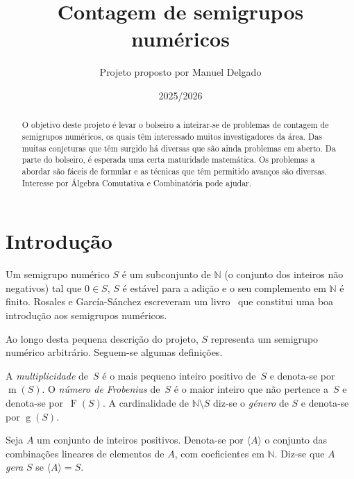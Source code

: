 \documentclass[12pt,a4paper]{article}
\title{Contagem de semigrupos numéricos}
\author{Projeto proposto por Manuel Delgado}
\date{2025/2026}
\numberwithin{table}{section}
\numberwithin{figure}{section}
\numberwithin{equation}{section}
\DeclareMathOperator{\Frobeniusoper}{F} %
\DeclareMathOperator{\multiplicityoper}{m} %
\DeclareMathOperator{\genusoper}{g} %
\theoremstyle{definition}
\theoremstyle{remark}
\begin{document}
\maketitle


\begin{abstract}
  
  O objetivo deste projeto é levar o bolseiro a inteirar-se de problemas de contagem de semigrupos numéricos, os quais têm interessado muitos investigadores da área. Das muitas conjeturas que têm surgido há diversas que são ainda problemas em aberto.
%
  Da parte do bolseiro, é esperada uma certa maturidade matemática. Os problemas a abordar são fáceis de formular e as técnicas que têm permitido avanços são diversas. Interesse por Álgebra Comutativa e Combinatória pode ajudar. 
 
\end{abstract}



\section{Introdução}\label{sec:introducao}

Um semigrupo numérico \(S\) é um subconjunto de \(\mathbb{N}\) (o conjunto dos inteiros não negativos) tal que \(0 \in S\), \(S\) é estável para a adição e o seu complemento em \(\mathbb{N}\) é finito.
%
Rosales e García-Sánchez escreveram um livro~\cite{RosalesGarcia2009Book-Numerical} que constitui uma boa introdução aos semigrupos numéricos. 

Ao longo desta pequena descrição do projeto, \(S\) representa um semigrupo numérico arbitrário. Seguem-se algumas definições.

A \emph{multiplicidade} de~\(S\) é o mais pequeno inteiro positivo de~\(S\) e denota-se por~\(\multiplicityoper(S)\).
O \emph{número de Frobenius} de~\(S\) é o maior inteiro que não pertence a~\(S\) e denota-se por~\(\Frobeniusoper(S)\).
A cardinalidade de \(\mathbb{N}\setminus S\) diz-se o \emph{género} de \(S\) e denota-se por \(\genusoper(S)\).

Seja \(A\) um conjunto de inteiros positivos. Denota-se por \(\langle A \rangle\) o conjunto das combinações lineares de elementos de \(A\), com coeficientes em \(\mathbb{N}\). Diz-se que \(A\) \emph{gera} \(S\) se \(\langle A \rangle = S\).
\end{document}
